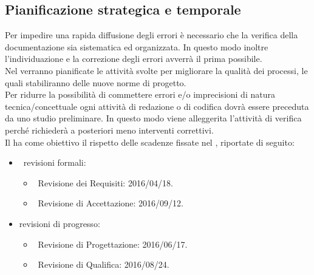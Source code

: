 	\subsection{Pianificazione strategica e temporale}
		Per impedire una rapida diffusione degli errori è necessario che la verifica della documentazione sia sistematica ed organizzata. In questo modo inoltre l'individuazione e la correzione degli errori avverrà il prima possibile. \\
		Nel \PPdoc verranno pianificate le attività svolte per migliorare la qualità dei processi, le quali stabiliranno delle nuove norme di progetto. \\
		Per ridurre la possibilità di commettere errori e/o imprecisioni di natura tecnica/concettuale ogni attività di redazione o di codifica dovrà essere preceduta da uno studio preliminare. In questo modo viene alleggerita l'attività di verifica perché richiederà a posteriori meno interventi correttivi. \\
		Il  ha come obiettivo il rispetto delle scadenze fissate nel \PPdoc, riportate di seguito:
		\begin{itemize}
			\item\ revisioni formali:
			\begin{itemize}
				\item\ Revisione dei Requisiti: 2016/04/18.
				\item\ Revisione di Accettazione: 2016/09/12.
			\end{itemize}
			\item revisioni di progresso:
			\begin{itemize}
				\item\ Revisione di Progettazione: 2016/06/17.
				\item\ Revisione di Qualifica: 2016/08/24.
			\end{itemize}
		\end{itemize}

		\label{sec:TecnicheAnalisi} %
		\label{sec:MisureGenerale} %
		\label{sec:Misure} %